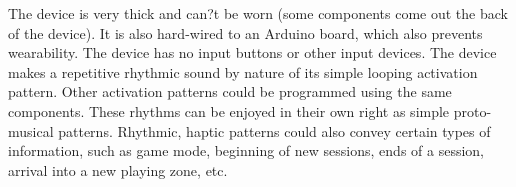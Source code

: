 \documentclass{chi-ext}
\begin{document}
The device is very thick and can?t be worn (some components come out the back of the device). It is also hard-wired to an Arduino board, which also prevents wearability. The device has no input buttons or other input devices. The device makes a repetitive rhythmic sound by nature of its simple looping activation pattern. Other activation patterns could be programmed using the same components. These rhythms can be enjoyed in their own right as simple proto-musical patterns. Rhythmic, haptic patterns could also convey certain types of information, such as game mode, beginning of new sessions, ends of a session, arrival into a new playing zone, etc. 





\end{document}
